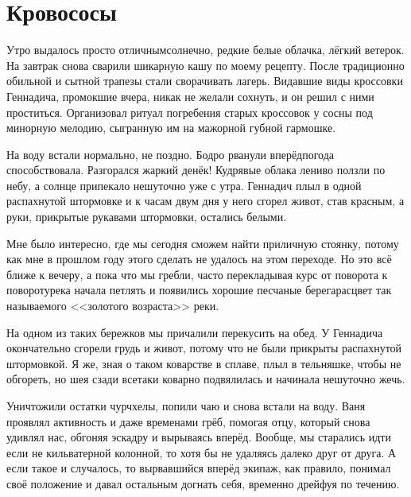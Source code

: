 \chapter{Кровососы} 

Утро выдалось просто отличным\mdash  солнечно, редкие белые облачка, лёгкий ветерок. На завтрак снова сварили шикарную кашу по моему рецепту. После традиционно обильной и сытной трапезы стали сворачивать лагерь. Видавшие виды кроссовки Геннадича, промокшие вчера, никак не желали сохнуть, и он решил с ними проститься. Организовал ритуал погребения старых кроссовок у сосны под минорную мелодию, сыгранную им на мажорной губной гармошке.

На воду встали нормально, не поздно.  Бодро рванули вперёд\mdash  погода способствовала. Разгорался жаркий денёк! Кудрявые облака лениво ползли по небу, а солнце припекало нешуточно уже с утра. Геннадич плыл в одной распахнутой штормовке и к часам двум дня у него сгорел живот, став красным, а руки, прикрытые рукавами штормовки, остались белыми. 

Мне было интересно, где мы сегодня сможем найти приличную стоянку, потому как мне в прошлом году этого сделать не удалось на этом переходе. Но это всё ближе к вечеру, а пока что мы гребли, часто перекладывая курс от поворота к повороту\mdash  река начала петлять и появились хорошие песчаные берега\mdash  расцвет так называемого <<золотого возраста>> реки.

На одном из таких бережков мы причалили перекусить на обед. У Геннадича окончательно сгорели грудь и живот, потому что не были прикрыты распахнутой штормовкой. Я же, зная о таком коварстве в сплаве, плыл в тельняшке, чтобы не обгореть, но шея сзади все\sdash таки коварно подвялилась и начинала нешуточно жечь.

Уничтожили остатки чурчхелы, попили чаю и снова встали на воду. Ваня проявлял активность и даже временами грёб, помогая отцу, который снова удивлял нас, обгоняя эскадру и вырываясь вперёд. Вообще, мы старались идти если не кильватерной колонной, то хотя бы не удаляясь далеко друг от друга. А если такое и случалось, то вырвавшийся вперёд экипаж, как правило, понимал своё положение и давал остальным догнать себя, временно дрейфуя по течению.

